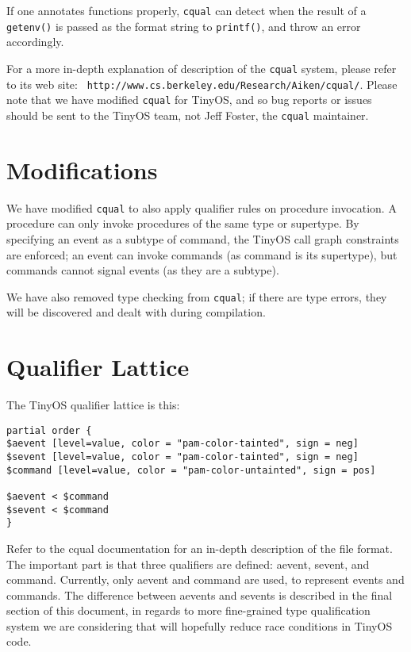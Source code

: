 \documentclass[12pt]{article}
\begin{document}
If one annotates functions properly, {\tt cqual} can
detect when the result of a {\tt getenv()} is passed as the format
string to {\tt printf()}, and throw an error accordingly.

For a more in-depth explanation of description of the {\tt cqual}
system, please refer to its web site: {\tt
http://www.cs.berkeley.edu/Research/Aiken/cqual/}. Please note that we
have modified {\tt cqual} for TinyOS, and so bug reports or issues
should be sent to the TinyOS team, not Jeff Foster, the {\tt cqual}
maintainer.

\section*{Modifications}

We have modified {\tt cqual} to also apply qualifier rules on
procedure invocation. A procedure can only invoke procedures of the
same type or supertype. By specifying an event as a subtype of
command, the TinyOS call graph constraints are enforced; an event can
invoke commands (as command is its supertype), but commands cannot
signal events (as they are a subtype).

We have also removed type checking from {\tt cqual}; if there are type
errors, they will be discovered and dealt with during compilation.

\section*{Qualifier Lattice}

The TinyOS qualifier lattice is this:

\begin{verbatim}
partial order {
$aevent [level=value, color = "pam-color-tainted", sign = neg]
$sevent [level=value, color = "pam-color-tainted", sign = neg]
$command [level=value, color = "pam-color-untainted", sign = pos]

$aevent < $command
$sevent < $command
}
\end{verbatim}

Refer to the cqual documentation for an in-depth description of the
file format. The important part is that three qualifiers are defined:
aevent, sevent, and command. Currently, only aevent and command are
used, to represent events and commands. The difference between aevents
and sevents is described in the final section of this document, in
regards to more fine-grained type qualification system we are
considering that will hopefully reduce race conditions in TinyOS code.
\end{document}
